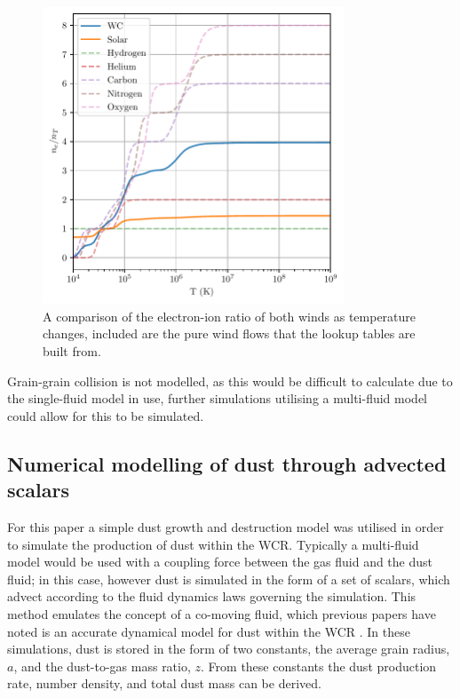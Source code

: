 \begin{figure}[ht]
  \centering
  \includegraphics[width=0.8\textwidth]{assets/electron_curves.pdf}
  \caption[OB and WR electron-ion ratios]{A comparison of the electron-ion ratio of both winds as temperature changes, included are the pure wind flows that the lookup tables are built from.}
  \label{fig:electron-curve}
\end{figure}

Grain-grain collision is not modelled, as this would be difficult to calculate due to the single-fluid model in use, further simulations utilising a multi-fluid model could allow for this to be simulated.



\subsection{Numerical modelling of dust through advected scalars}

For this paper a simple dust growth and destruction model was utilised in order to simulate the production of dust within the WCR. Typically a multi-fluid model would be used with a coupling force between the gas fluid and the dust fluid; in this case, however dust is simulated in the form of a set of scalars, which advect according to the fluid dynamics laws governing the simulation. This method emulates the concept of a co-moving fluid, which previous papers have noted is an accurate dynamical model for dust within the WCR \cite{hendrix_pinwheels_2016}. In these simulations, dust is stored in the form of two constants, the average grain radius, $a$, and the dust-to-gas mass ratio, $z$. From these constants the dust production rate, number density, and total dust mass can be derived.

